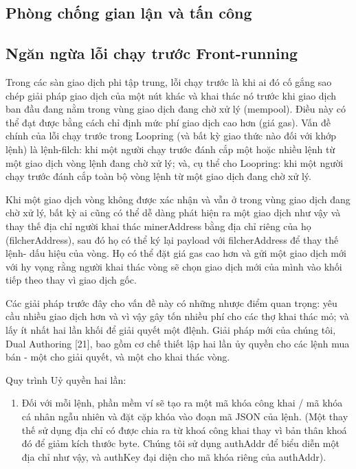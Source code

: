 \documentclass[12pt,a4paper]{article}
\begin{document}
\begin{multicols}{2}
\section{Phòng chống gian lận và tấn công}

\subsection{Ngăn ngừa lỗi chạy trước Front-running \label{sec:dual_authoring}}
Trong các sàn giao dịch phi tập trung, lỗi chạy trước là khi ai đó cố gắng sao chép giải pháp giao dịch của một nút khác và khai thác nó trước khi giao dịch ban đầu đang nằm trong vùng giao dịch đang chờ xử lý (mempool). Điều này có thể đạt được bằng cách chỉ định mức phí giao dịch cao hơn (giá gas). Vấn đề chính của lỗi chạy trước trong Loopring (và bất kỳ giao thức nào đối với khớp lệnh) là lệnh-filch: khi một người chạy trước đánh cắp một hoặc nhiều lệnh từ một giao dịch vòng lệnh đang chờ xử lý; và, cụ thể cho Loopring: khi một người chạy trước đánh cắp toàn bộ vòng lệnh từ một giao dịch đang chờ xử lý.

Khi một giao dịch vòng không được xác nhận và vẫn ở trong vùng giao dịch đang chờ xử lý, bất kỳ ai cũng có thể dễ dàng phát hiện ra một giao dịch như vậy và thay thế địa chỉ người khai thác minerAddress bằng địa chỉ riêng của họ (filcherAddress), sau đó họ có thể ký lại payload với filcherAddress để thay thế lệnh- dấu hiệu của vòng. Họ có thể đặt giá gas cao hơn và gửi một giao dịch mới với hy vọng rằng người khai thác vòng sẽ chọn giao dịch mới của mình vào khối tiếp theo thay vì giao dịch gốc.

Các giải pháp trước đây cho vấn đề này có những nhược điểm quan trọng: yêu cầu nhiều giao dịch hơn và vì vậy gây tốn nhiều phí cho các thợ khai thác mỏ; và lấy ít nhất hai lần khối để giải quyết một đlệnh. Giải pháp mới của chúng tôi, Dual Authoring [21], bao gồm cơ chế thiết lập hai lần ủy quyền cho các lệnh mua bán - một cho giải quyết, và một cho khai thác vòng.

Quy trình Uỷ quyền hai lần:
\begin{enumerate}

	\item Đối với mỗi lệnh, phần mềm ví sẽ tạo ra một mã khóa công khai / mã khóa cá nhân ngẫu nhiên và đặt cặp khóa vào đoạn mã JSON của lệnh. (Một thay thế sử dụng địa chỉ có được chia ra từ khoá công khai thay vì bản thân khoá đó để giảm kích thước byte. Chúng tôi sử dụng authAddr để biểu diễn một địa chỉ như vậy, và authKey đại diện cho mã khóa riêng của authAddr).


\end{enumerate}
\end{multicols}
\end{document}
